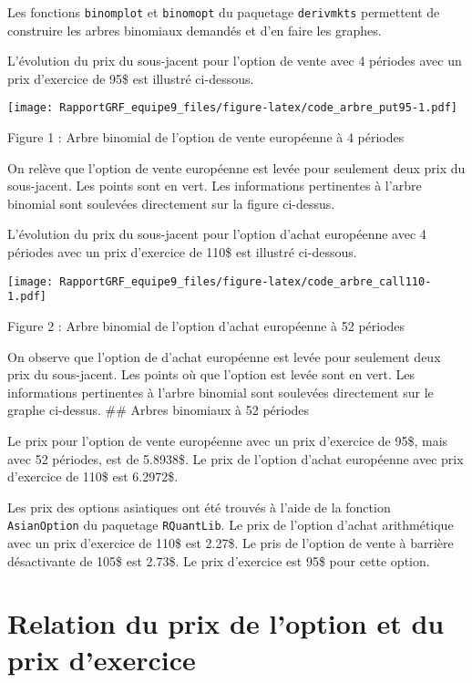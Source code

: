 \documentclass[
]{article}
\begin{document}
Les fonctions \texttt{binomplot} et \texttt{binomopt} du paquetage
\texttt{derivmkts} permettent de construire les arbres binomiaux
demandés et d'en faire les graphes.

L'évolution du prix du sous-jacent pour l'option de vente avec 4
périodes avec un prix d'exercice de 95\$ est illustré ci-dessous.

\texttt{[image: RapportGRF\_equipe9\_files/figure-latex/code\_arbre\_put95-1.pdf]}

\begin{center}
\textsf{Figure 1 : Arbre binomial de l'option de vente européenne à 4 périodes}
\end{center}

On relève que l'option de vente européenne est levée pour seulement deux
prix du sous-jacent. Les points sont en vert. Les informations
pertinentes à l'arbre binomial sont soulevées directement sur la figure
ci-dessus.

\newpage

L'évolution du prix du sous-jacent pour l'option d'achat européenne avec
4 périodes avec un prix d'exercice de 110\$ est illustré ci-dessous.

\texttt{[image: RapportGRF\_equipe9\_files/figure-latex/code\_arbre\_call110-1.pdf]}

\begin{center}
\textsf{Figure 2 : Arbre binomial de l'option d'achat européenne à 52 périodes}
\end{center}

On observe que l'option de d'achat européenne est levée pour seulement
deux prix du sous-jacent. Les points où que l'option est levée sont en
vert. Les informations pertinentes à l'arbre binomial sont soulevées
directement sur le graphe ci-dessus. \newpage \#\# Arbres binomiaux à 52
périodes

Le prix pour l'option de vente européenne avec un prix d'exercice de
95\$, mais avec 52 périodes, est de 5.8938\$. Le prix de l'option
d'achat européenne avec prix d'exercice de 110\$ est 6.2972\$.

Les prix des options asiatiques ont été trouvés à l'aide de la fonction
\texttt{AsianOption} du paquetage \texttt{RQuantLib}. Le prix de
l'option d'achat arithmétique avec un prix d'exercice de 110\$ est
2.27\$. Le pris de l'option de vente à barrière désactivante de 105\$
est 2.73\$. Le prix d'exercice est 95\$ pour cette option.

\newpage

\section{Relation du prix de l'option et du prix
d'exercice}\label{relation-du-prix-de-loption-et-du-prix-dexercice}
\end{document}
